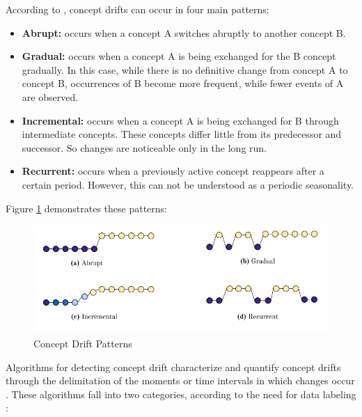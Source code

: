 \documentclass[preprint,12pt]{elsarticle}
\begin{document}
According to \cite{tsymbal2004problem, Gama:2014:DAF:2670967.2670971}, concept drifts can occur in four main patterns:

\begin{itemize}
    \item \textbf{Abrupt:} occurs when a concept A switches abruptly to another concept B.
    \item \textbf{Gradual:} occurs when a concept A is being exchanged for the B concept gradually. In this case, while there is no definitive change from concept A to concept B, occurrences of B become more frequent, while fewer events of A are observed.
    \item \textbf{Incremental:} occurs when a concept A is being exchanged for B through intermediate concepts.  These concepts differ little from its predecessor and successor. So changes are noticeable only in the long run.
    \item \textbf{Recurrent:} occurs when a previously active concept reappears after a certain period. However, this can not be understood as a periodic seasonality.
\end{itemize}

Figure \ref{fig:concept_drift_patterns} demonstrates these patterns:

\begin{figure}[h!]
\begin{center}
    \includegraphics[scale=0.65]{img/concept_drift_patterns.png}
    \caption{Concept Drift Patterns}
    \label{fig:concept_drift_patterns}
\end{center}
\end{figure}

Algorithms for detecting concept drift characterize and quantify concept drifts through the delimitation of the moments or time intervals in which changes occur \cite{Basseville:1993:DAC:151741}.
%
These algorithms fall into two categories, according to the need for data labeling \cite{Zliobaite:2010}:
\end{document}
